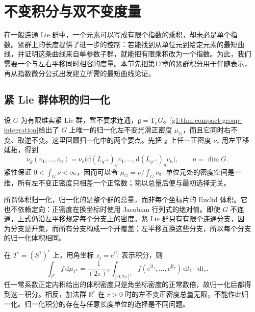 
% 
% 

\section{不变积分与双不变度量}
\label{g1:sec:1901}

在一般连通 Lie 群中，一个元素可以写成有限个指数的乘积，却未必是单个指数。紧群上的长度提供了进一步的控制：若能找到从单位元到给定元素的最短曲线，并证明这条曲线来自单参数子群，就能把有限乘积改为一个指数。为此，我们需要一个与左右平移同时相容的度量。本节先把第17章的紧群积分用于伴随表示，再从指数微分公式出发建立所需的最短曲线论证。

\subsection{紧 Lie 群体积的归一化}
\label{g1:subsec:1901:01}
设 \(G\) 为有限维实紧 Lie 群，暂不要求连通，\(\mathfrak g=\mathrm{T}_eG\)。\cref{g1:thm:compact-group-integration}给出了 \(G\) 上唯一的归一化左不变光滑正密度 \(\mu_G\)，而且它同时右不变、取逆不变。这里回顾归一化中的两个要点。先把 \(\mathfrak g\) 上任一正密度 \(\nu_e\) 用左平移延拓，得到
\[
	\nu_g(v_1,\ldots,v_n)
	=\nu_e\bigl(\mathrm{d}(L_{g^{-1}})_gv_1,\ldots,
	\mathrm{d}(L_{g^{-1}})_gv_n\bigr),\qquad n=\dim G.
\]
紧性保证 \(0<\int_G\nu<\infty\)，因而可以令 \(\mu_G=\nu/\int_G\nu\)。单位元处的密度空间是一维，所有左不变正密度只相差一个正常数；除以总量后便与最初选择无关。

\ProseParagraphBreak

所谓体积归一化，归一化的是整个群的总量，而非每个坐标片的 Euclid 体积。它也不依赖定向：正密度在换坐标时使用 Jacobian 行列式的绝对值。即使 \(G\) 不连通，上式仍沿左平移规定每个分支上的密度。紧 Lie 群只有有限个连通分支，因为分支是开集，而所有分支构成一个开覆盖；左平移互换这些分支，所以每个分支的归一化体积相同。

\begin{example}\label{g1:exm:normalized-volume-torus}
	在 \(T^r=(S^1)^r\) 上，用角坐标 \(z_j=e^{\mathrm{i}t_j}\) 表示积分，则
	\[
		\int_{T^r}f\,\mathrm{d}\mu_{T^r}
		=\frac1{(2\pi)^r}\int_{[0,2\pi]^r}
		f(e^{\mathrm{i}t_1},\ldots,e^{\mathrm{i}t_r})\,\mathrm{d}t_1\cdots\mathrm{d}t_r.
	\]
	任一常系数正定内积给出的体积密度只是角坐标密度的正常数倍，故归一化后都得到这一积分。相反，加法群 \(\mathbb R^r\) 在 \(r>0\) 时的左不变正密度总量无限，不能作此归一化。归一化积分的存在与任意长度单位的选择是不同问题。
\end{example}

